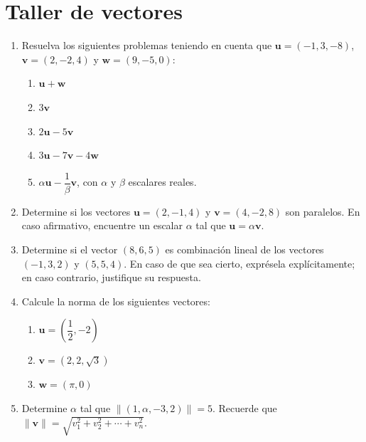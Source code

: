 \documentclass[12pt,letterpaper]{article}
\begin{document}
\section*{Taller de vectores}

\begin{enumerate}
    \item Resuelva los siguientes problemas teniendo en cuenta que $\mathbf{u} = (-1,3,-8)$, $\mathbf{v} = (2,-2,4)$ y $\mathbf{w} = (9,-5,0)$:
    \begin{enumerate}
        \item $\mathbf{u} + \mathbf{w}$
        \item $3\mathbf{v}$
        \item $2\mathbf{u} - 5\mathbf{v}$
        \item $3\mathbf{u} - 7\mathbf{v} - 4\mathbf{w}$
        \item $\alpha \mathbf{u} - \dfrac{1}{\beta} \mathbf{v}$, con $\alpha$ y $\beta$ escalares reales.
    \end{enumerate}
    
    \item Determine si los vectores $\mathbf{u} = (2,-1,4)$ y $\mathbf{v} = (4,-2,8)$ son paralelos. En caso afirmativo, encuentre un escalar $\alpha$ tal que $\mathbf{u}=\alpha\mathbf{v}$.
    
    \item Determine si el vector $(8,6,5)$ es combinación lineal de los vectores $(-1,3,2)$ y $(5,5,4)$. En caso de que sea cierto, exprésela explícitamente; en caso contrario, justifique su respuesta.
    
    \item Calcule la norma de los siguientes vectores:
    \begin{enumerate}
        \item $\mathbf{u} = \left(\dfrac{1}{2}, -2\right)$
        \item $\mathbf{v} = (2,2,\sqrt{3})$
        \item $\mathbf{w} = (\pi,0)$
    \end{enumerate}
    
    \item Determine $\alpha$ tal que $\|(1, \alpha, -3, 2)\| = 5$. Recuerde que $\|\mathbf{v}\| = \sqrt{v_1^2 + v_2^2 + \cdots + v_n^2}$.
    
\end{enumerate}
\end{document}
